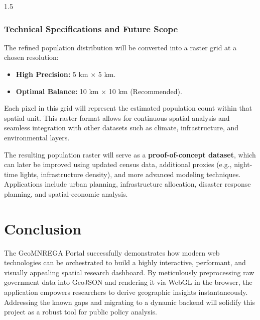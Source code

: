 \documentclass[12pt,a4paper]{report}
\begin{document}
\begin{spacing}{1.5}
\subsection{Technical Specifications and Future Scope}
The refined population distribution will be converted into a raster grid at a chosen resolution:
\begin{itemize}
    \item \textbf{High Precision:} 5 km $\times$ 5 km.
    \item \textbf{Optimal Balance:} 10 km $\times$ 10 km (Recommended).
\end{itemize}
Each pixel in this grid will represent the estimated population count within that spatial unit. This raster format allows for continuous spatial analysis and seamless integration with other datasets such as climate, infrastructure, and environmental layers.

The resulting population raster will serve as a \textbf{proof-of-concept dataset}, which can later be improved using updated census data, additional proxies (e.g., night-time lights, infrastructure density), and more advanced modeling techniques. Applications include urban planning, infrastructure allocation, disaster response planning, and spatial-economic analysis.

\chapter{Conclusion}
The GeoMNREGA Portal successfully demonstrates how modern web technologies can be orchestrated to build a highly interactive, performant, and visually appealing spatial research dashboard. By meticulously preprocessing raw government data into GeoJSON and rendering it via WebGL in the browser, the application empowers researchers to derive geographic insights instantaneously. Addressing the known gaps and migrating to a dynamic backend will solidify this project as a robust tool for public policy analysis.

\end{spacing}
\end{document}
